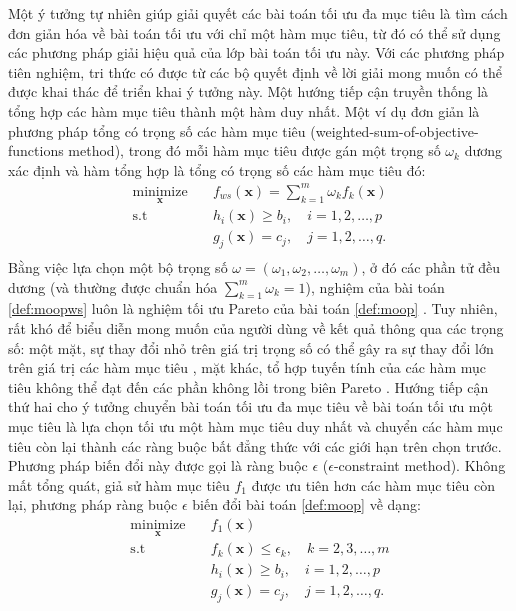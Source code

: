 \documentclass[../main.tex]{subfiles}
\begin{document}
Một ý tưởng tự nhiên giúp giải quyết các bài toán tối ưu đa mục tiêu là tìm cách đơn giản hóa về bài toán tối ưu với chỉ một hàm mục tiêu, từ đó có thể sử dụng các phương pháp giải hiệu quả của lớp bài toán tối ưu này. Với các phương pháp tiên nghiệm, tri thức có được từ các bộ quyết định về lời giải mong muốn có thể được khai thác để triển khai ý tưởng này. Một hướng tiếp cận truyền thống là tổng hợp các hàm mục tiêu thành một hàm duy nhất. Một ví dụ đơn giản là phương pháp tổng có trọng số các hàm mục tiêu (weighted-sum-of-objective-functions method), trong đó mỗi hàm mục tiêu được gán một trọng số $\omega_k$ dương xác định và hàm tổng hợp là tổng có trọng số các hàm mục tiêu đó:
\begin{equation}\label{def:moopws}
\begin{aligned}
\underset{\mathbf{x}}{\text{minimize}} \quad & f_{ws}\left(\mathbf{x}\right) = \sum_{k=1}^{m}{\omega_kf_k\left(\mathbf{x}\right)} \\
\textrm{s.t} \quad & h_i\left(\mathbf{x}\right) \geq b_i, \quad i=1,2,\dots,p \\
\quad & g_j\left(\mathbf{x}\right) = c_j, \quad j=1,2,\dots,q.\\
\end{aligned}
\end{equation}
Bằng việc lựa chọn một bộ trọng số $\omega=\left(\omega_1,\omega_2,\dots,\omega_m\right)$, ở đó các phần tử đều dương (và thường được chuẩn hóa $\sum_{k=1}^m{\omega_k} = 1$), nghiệm của bài toán \eqref{def:moopws} luôn là nghiệm tối ưu Pareto của bài toán \eqref{def:moop} \cite[Định lý 3.1.2 trang 78]{miettinen1999}. Tuy nhiên, rất khó để biểu diễn mong muốn của người dùng về kết quả thông qua các trọng số: một mặt, sự thay đổi nhỏ trên giá trị trọng số có thể gây ra sự thay đổi lớn trên giá trị các hàm mục tiêu \cite{miettinen1999}, mặt khác, tổ hợp tuyến tính của các hàm mục tiêu không thể đạt đến các phần không lồi trong biên Pareto \cite{collette2004multiobjective}. Hướng tiếp cận thứ hai cho ý tưởng chuyển bài toán tối ưu đa mục tiêu về bài toán tối ưu một mục tiêu là lựa chọn tối ưu một hàm mục tiêu duy nhất và chuyển các hàm mục tiêu còn lại thành các ràng buộc bất đẳng thức với các giới hạn trên chọn trước. Phương pháp biến đổi này được gọi là ràng buộc $\epsilon$ ($\epsilon$-constraint method). Không mất tổng quát, giả sử hàm mục tiêu $f_1$ được ưu tiên hơn các hàm mục tiêu còn lại, phương pháp ràng buộc $\epsilon$ biến đổi bài toán \eqref{def:moop} về dạng:
\begin{equation}\label{def:moopeps}
\begin{aligned}
\underset{\mathbf{x}}{\text{minimize}} \quad & f_1\left(\mathbf{x}\right) \\
\textrm{s.t} 
\quad & f_k\left(\mathbf{x}\right) \leq \epsilon_k, \quad k=2,3,\dots,m\\
\quad & h_i\left(\mathbf{x}\right) \geq b_i, \quad i=1,2,\dots,p \\
\quad & g_j\left(\mathbf{x}\right) = c_j, \quad j=1,2,\dots,q.\\
\end{aligned}
\end{equation}
\end{document}

